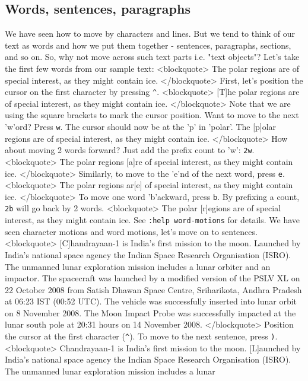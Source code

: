 \subsection{Words, sentences, paragraphs} 
We have seen how to move by characters and lines. But we tend to
think of our text as words and how we put them together - sentences,
paragraphs, sections, and so on. So, why not move across such text parts i.e.
"text objects"? Let's take the first few words from our sample text:
<blockquote> The polar regions are of special interest, as they might contain
ice. </blockquote> First, let's position the cursor on the first character by
pressing \texttt{\^}. <blockquote> [T]he polar regions are of special interest,
as they might contain ice. </blockquote> Note that we are using the square
brackets to mark the cursor position. Want to move to the next 'w'ord? Press
\texttt{w}. The cursor should now be at the 'p' in 'polar'. The
[p]olar regions are of special interest, as they might contain ice.
</blockquote> How about moving 2 words forward? Just add the prefix count to
'w': \texttt{2w}. <blockquote> The polar regions [a]re of special interest, as
they might contain ice. </blockquote> Similarly, to move to the 'e'nd of the
next word, press \texttt{e}. <blockquote> The polar regions ar[e] of special
interest, as they might contain ice. </blockquote> To move one word 'b'ackward,
press \texttt{b}. By prefixing a count, \texttt{2b} will go back by 2 words.
<blockquote> The polar [r]egions are of special interest, as they might contain
ice. See \texttt{:help word-motions} for details. We have seen
character motions and word motions, let's move on to sentences. <blockquote>
[C]handrayaan-1 is India's first mission to the moon. Launched by India's
national space agency the Indian Space Research Organisation (ISRO). The
unmanned lunar exploration mission includes a lunar orbiter and an impactor.
The spacecraft was launched by a modified version of the PSLV XL on 22 October
2008 from Satish Dhawan Space Centre, Sriharikota, Andhra Pradesh at 06:23 IST
(00:52 UTC). The vehicle was successfully inserted into lunar orbit on 8
November 2008. The Moon Impact Probe was successfully impacted at the lunar
south pole at 20:31 hours on 14 November 2008. </blockquote> Position the
cursor at the first character (\texttt{\^}). To move to the next sentence, press
\texttt{)}. <blockquote> Chandrayaan-1 is India's first mission to the moon.
[L]aunched by India's national space agency the Indian Space Research
Organisation (ISRO). The unmanned lunar exploration mission includes a lunar
